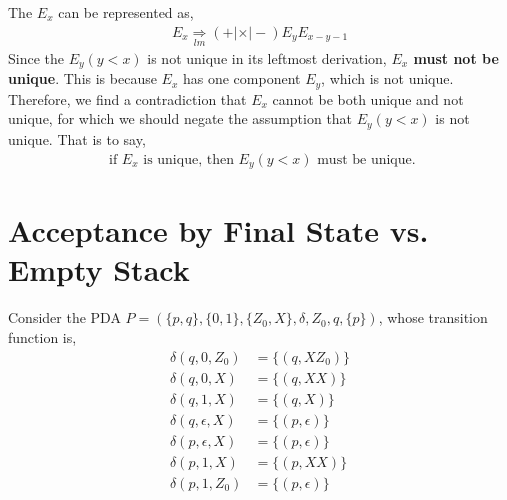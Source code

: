 \documentclass[11pt,a4paper]{article}
\newcommand{\htab}{\hspace*{0.63cm}}
\newcommand{\lmd}{\underset{lm}{\Longrightarrow}}
\begin{document}
\htab The $E_{x}$ can be represented as,
\begin{align}
    E_{x} \lmd (+|\times | -)E_{y} E_{x-y-1}
    \end{align}
\htab Since the $E_{y}(y<x)$ is not unique in its leftmost derivation, \textbf{$E_{x}$ must not be unique}. 
This is because $E_{x}$ has one component $E_{y}$, which is not unique.\\
\htab Therefore, we find a contradiction that $E_{x}$ cannot be both unique and not unique,
for which we should negate the assumption that $E_{y}(y<x)$ is not unique. That is to say,
\begin{align}
    \text{ if $E_{x}$ is unique, then $E_{y}(y < x)$ must be unique.}
    \end{align}
\newpage
\section{Acceptance by Final State vs. Empty Stack}
\htab Consider the PDA $P = (\{p, q\}, \{ 0, 1\}, \{Z_{0}, X\}, \delta, Z_{0}, q,\{p\})$, 
whose transition function is,
    \begin{align}
        \delta(q, 0, Z_{0}) &= \{ (q, XZ_{0})\} \\
        \delta(q, 0, X) &= \{ (q, XX)\} \\
        \delta(q, 1, X) &= \{ (q, X) \} \\
        \delta(q, \epsilon, X) &= \{ (p, \epsilon)\} \\
        \delta(p, \epsilon, X) &= \{ (p, \epsilon)\} \\
        \delta(p, 1, X) &= \{ (p, XX)\} \\
        \delta(p, 1, Z_{0}) &= \{ (p, \epsilon)\} 
    \end{align}
\end{document}
